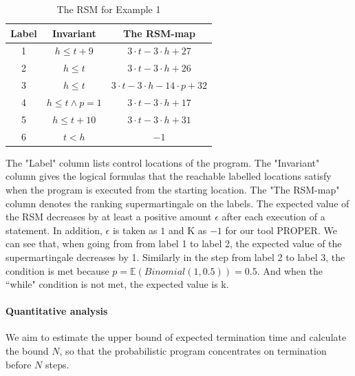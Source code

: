 \documentclass[runningheads]{llncs}
\begin{document}
\begin{table}[htb]
	\centering
	\caption{The RSM for Example 1}
	\label{RSM}
	\begin{tabular}{|c|c|c|}
		\hline
		Label& Invariant & The RSM-map  \\ \hline
		1 & $h\leq t+9$ &$3\cdot t-3\cdot h+27$ \\ \hline
		2 & $h\leq t$ &$3\cdot t-3\cdot h+26$ \\ \hline
		3 & $h\leq t$  &$3\cdot t-3\cdot h-14\cdot p+32$ \\ \hline
		4 & $h\leq t\land p=1$ &$3\cdot t-3\cdot h+17$ \\ \hline
		5 & $h\leq t+10$&$3\cdot t-3\cdot h+31$ \\ \hline
		6 & $t<h$ &$-1$ \\ \hline
	\end{tabular}
\end{table}

The "Label" column lists control locations of the program. The "Invariant" column gives the logical formulas that the reachable labelled locations satisfy when the program is executed from the starting location. The "The RSM-map" column denotes the ranking supermartingale on the labels. The expected value of the RSM decreases by at least a positive amount $\epsilon$ after each execution of a statement. In addition, $\epsilon$ is taken as $1$ and K as $-1$ for our tool PROPER. We can see that, 
when going from from label 1 to label 2, the expected value of the supermartingale decreases by 1. Similarly  in the step from label 2 to label 3,  the condition is met because $p=\mathbb{E}(Binomial(1,0.5))=0.5$. And when the ``while" condition is not met, the expected value is k.

\paragraph{Quantitative analysis} We aim to estimate the upper bound of expected termination time and calculate the bound $N$, so that the probabilistic program concentrates on termination before $N$ steps. 
\end{document}
